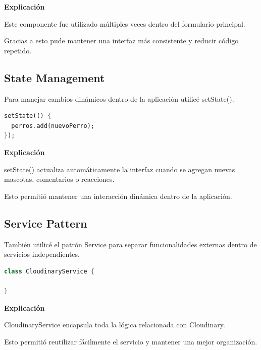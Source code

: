 \documentclass[12pt]{article}
\begin{document}
\textbf{Explicación}

Este componente fue utilizado múltiples veces dentro del formulario principal.

Gracias a esto pude mantener una interfaz más consistente y reducir código repetido.


\subsection{State Management}

Para manejar cambios dinámicos dentro de la aplicación utilicé setState().

\begin{lstlisting}[language=Dart]
setState(() {
  perros.add(nuevoPerro);
});
\end{lstlisting}

\textbf{Explicación}

setState() actualiza automáticamente la interfaz cuando se agregan nuevas mascotas, comentarios o reacciones.

Esto permitió mantener una interacción dinámica dentro de la aplicación.


\subsection{Service Pattern}

También utilicé el patrón Service para separar funcionalidades externas dentro de servicios independientes.

\begin{lstlisting}[language=Dart]
class CloudinaryService {

}
\end{lstlisting}

\textbf{Explicación}

CloudinaryService encapsula toda la lógica relacionada con Cloudinary.

Esto permitió reutilizar fácilmente el servicio y mantener una mejor organización.

\end{document}
